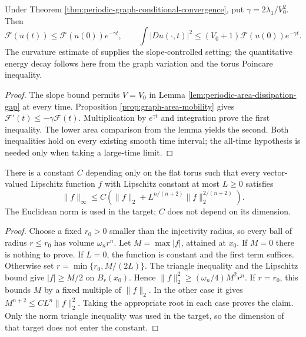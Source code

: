 \begin{theorem}\label{thm:periodic-area-exponential-decay}
Under Theorem \ref{thm:periodic-graph-conditional-convergence}, put $\gamma=2\lambda_1/V_0^2$. Then
\[
 \mathcal F(u(t))\leq\mathcal F(u(0))e^{-\gamma t},\qquad
 \int|Du(\cdot,t)|^2\leq(V_0+1)\mathcal F(u(0))e^{-\gamma t}.
\]
The curvature estimate of \cite{EH89} supplies the slope-controlled setting; the quantitative energy decay follows here from the graph variation and the torus Poincare inequality.
\end{theorem}
\begin{proof}
The slope bound permits $V=V_0$ in Lemma \ref{lem:periodic-area-dissipation-gap} at every time. Proposition \ref{prop:graph-area-mobility} gives
$\mathcal F'(t)\leq-\gamma\mathcal F(t)$.
Multiplication by $e^{\gamma t}$ and integration prove the first inequality. The lower area comparison from the lemma yields the second. Both inequalities hold on every existing smooth time interval; the all-time hypothesis is needed only when taking a large-time limit.
\end{proof}

\begin{lemma}\label{lem:torus-lipschitz-l2-interpolation}
There is a constant $C$ depending only on the flat torus such that every vector-valued Lipschitz function $f$ with Lipschitz constant at most $L\geq0$ satisfies
\[
 \|f\|_\infty\leq C\left(\|f\|_2+
                      L^{n/(n+2)}\|f\|_2^{2/(n+2)}\right).
\]
The Euclidean norm is used in the target; $C$ does not depend on its dimension.
\end{lemma}
\begin{proof}
Choose a fixed $r_0>0$ smaller than the injectivity radius, so every ball of radius $r\leq r_0$ has volume $\omega_nr^n$. Let $M=\max|f|$, attained at $x_0$. If $M=0$ there is nothing to prove. If $L=0$, the function is constant and the first term suffices. Otherwise set $r=\min\{r_0,M/(2L)\}$. The triangle inequality and the Lipschitz bound give $|f|\geq M/2$ on $B_r(x_0)$. Hence
$\|f\|_2^2\geq(\omega_n/4)M^2r^n$.
If $r=r_0$, this bounds $M$ by a fixed multiple of $\|f\|_2$. In the other case it gives $M^{n+2}\leq C L^n\|f\|_2^2$. Taking the appropriate root in each case proves the claim. Only the norm triangle inequality was used in the target, so the dimension of that target does not enter the constant.
\end{proof}

